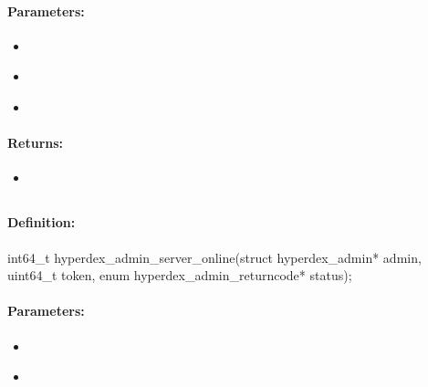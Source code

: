 \paragraph{Parameters:}
\begin{itemize}[noitemsep]
\item {}\\

\item {}\\

\item {}\\

\end{itemize}

\paragraph{Returns:}
\begin{itemize}[noitemsep]
\item {}\\

\end{itemize}

\pagebreak
\subsection{}
\label{api:c:server_online}


\paragraph{Definition:}
\begin{ccode}
int64_t hyperdex_admin_server_online(struct hyperdex_admin* admin,
        uint64_t token,
        enum hyperdex_admin_returncode* status);
\end{ccode}

\paragraph{Parameters:}
\begin{itemize}[noitemsep]
\item {}\\

\item {}\\

\end{itemize}


